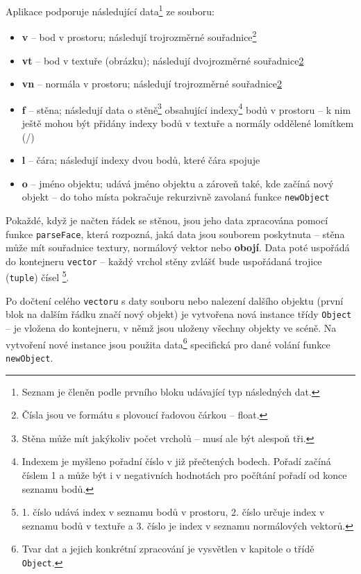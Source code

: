 \documentclass[a4paper, 12pt]{report}
\begin{document}
Aplikace podporuje následující data\footnote{Seznam je členěn podle prvního bloku udávající typ následných dat.} ze souboru:
\begin{itemize}
    \item \textbf{v} -- bod v prostoru; následují trojrozměrné souřadnice\footnote{\label{float}Čísla jsou ve formátu s plovoucí řadovou čárkou -- float.}
    \item \textbf{vt} -- bod v textuře (obrázku); následují dvojrozměrné souřadnice\cref{float}
    \item \textbf{vn} -- normála v prostoru; následují trojrozměrné souřadnice\cref{float}
    \item \textbf{f} -- stěna; následují data o stěně\footnote{Stěna může mít jakýkoliv počet vrcholů -- musí ale být alespoň tři.} obsahující indexy\footnote{Indexem je myšleno pořadní číslo v již přečtených bodech. Pořadí začíná číslem 1 a může být i v negativních hodnotách pro počítání pořadí od konce seznamu bodů.} bodů v prostoru -- k nim ještě mohou být přidány indexy bodů v textuře a normály oddělené lomítkem (/)
    \item \textbf{l} -- čára; následují indexy dvou bodů, které čára spojuje
    \item \textbf{o} -- jméno objektu; udává jméno objektu a zároveň také, kde začíná nový objekt -- do toho místa pokračuje rekurzivně zavolaná funkce \texttt{newObject}
\end{itemize}

Pokaždé, když je načten řádek se stěnou, jsou jeho data zpracována pomocí funkce \texttt{parseFace}, která rozpozná, jaká data jsou souborem poskytnuta -- stěna může mít souřadnice textury, normálový vektor nebo \textbf{obojí}. Data poté uspořádá do kontejneru \texttt{vector} -- každý vrchol stěny zvlášť bude uspořádaná trojice (\texttt{tuple}) čísel \footnote{1. číslo udává index v seznamu bodů v prostoru, 2. číslo určuje index v seznamu bodů v textuře a 3. číslo je index v seznamu normálových vektorů.}.

Po dočtení celého \texttt{vectoru} s daty souboru nebo nalezení dalšího objektu (první blok na dalším řádku značí nový objekt) je vytvořena nová instance třídy \texttt{Object} -- je vložena do kontejneru, v němž jsou uloženy všechny objekty ve scéně. Na vytvoření nové instance jsou použita data\footnote{Tvar dat a jejich konkrétní zpracování je vysvětlen v kapitole o třídě \texttt{Object}.} specifická pro dané volání funkce \texttt{newObject}.
\end{document}
